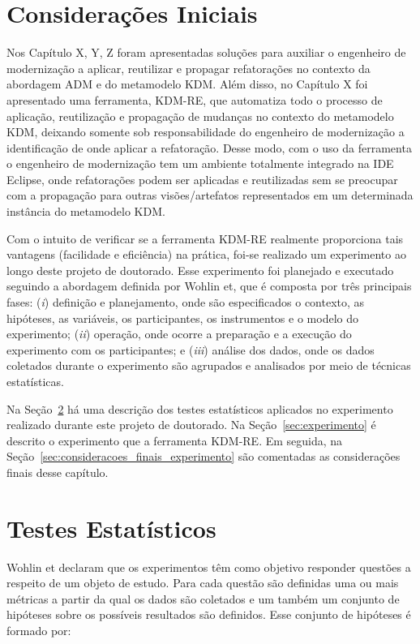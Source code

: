 \section{Considerações Iniciais}

Nos Capítulo X, Y, Z foram apresentadas soluções para auxiliar o engenheiro de modernização a aplicar, reutilizar e propagar refatorações no contexto da abordagem ADM e do metamodelo KDM. Além disso, no Capítulo X foi apresentado uma ferramenta, KDM-RE, que automatiza todo o processo de aplicação, reutilização e propagação de mudanças no contexto do metamodelo KDM, deixando somente sob responsabilidade do engenheiro de modernização a identificação de onde aplicar a refatoração. Desse modo, com o uso da ferramenta o engenheiro de modernização tem um ambiente totalmente integrado na IDE Eclipse, onde refatorações podem ser aplicadas e reutilizadas sem se preocupar com a propagação para outras visões/artefatos representados em um determinada instância do metamodelo KDM. 

Com o intuito de verificar se a ferramenta KDM-RE realmente proporciona tais vantagens (facilidade e eficiência) na prática, foi-se realizado um experimento ao longo deste projeto de doutorado. Esse experimento foi planejado e executado seguindo a abordagem definida por Wohlin et, que é composta por três principais fases: (\textit{i}) definição e planejamento, onde são especificados o contexto, as hipóteses, as variáveis, os participantes, os instrumentos e o modelo do experimento; (\textit{ii}) operação, onde ocorre a preparação e a execução do experimento com os participantes; e (\textit{iii}) análise dos dados, onde os dados coletados durante o experimento são agrupados e analisados por meio de técnicas estatísticas.

Na Seção~\ref{sec:teste_estatisticos} há uma descrição dos testes estatísticos aplicados no experimento realizado durante este projeto de doutorado. Na Seção~\ref{sec:experimento} é descrito o experimento que a ferramenta KDM-RE. Em seguida, na Seção~\ref{sec:consideracoes_finais_experimento} são comentadas as considerações finais desse capítulo.

\section{Testes Estatísticos}\label{sec:teste_estatisticos}

Wohlin et declaram que os experimentos têm como objetivo responder questões a respeito de um objeto de estudo. Para cada questão são definidas uma ou mais métricas a partir da qual os dados são coletados e um também um conjunto de hipóteses sobre os possíveis resultados são definidos. Esse conjunto de hipóteses é formado por:

